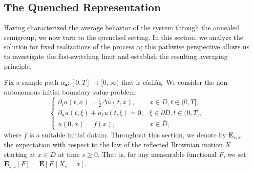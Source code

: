 \documentclass[11pt]{amsart}
\theoremstyle{plain}
\theoremstyle{definition}
\theoremstyle{remark}
\begin{document}
	\subsection{The Quenched Representation}
	Having characterized the average behavior of the system through the annealed semigroup, we now turn to the quenched setting. In this section, we analyze the solution for fixed realizations of the process $\alpha$; this pathwise perspective allows us to investigate the fast-switching limit and establish the resulting averaging principle.
	
	Fix a sample path $\alpha_\bullet: [0,T] \to [0,\infty)$ that is c\`adl\`ag. We consider the non-autonomous initial boundary value problem:
	\begin{equation}\label{P_alpha}
		\begin{cases}
			\partial_t u(t,x) = \tfrac{1}{2}\Delta u(t,x), & x \in D, t \in (0,T], \\
			\partial_n u(t,\xi) + \alpha_t u(t,\xi) = 0, & \xi \in \partial D, t \in (0,T], \\
			u(0,x) = f(x), & x \in \overline{D},
		\end{cases}
	\end{equation}
	where $f$ is a suitable initial datum. Throughout this section, we denote by $\mathbf{E}_{s,x}$ the expectation with respect to the law of the reflected Brownian motion $X$ starting at $x \in \overline{D}$ at time $s \ge 0$. That is, for any measurable functional $F$, we set $\mathbf{E}_{s,x}[F] = \mathbf{E}[F \mid X_s = x]$.
	
\end{document}
